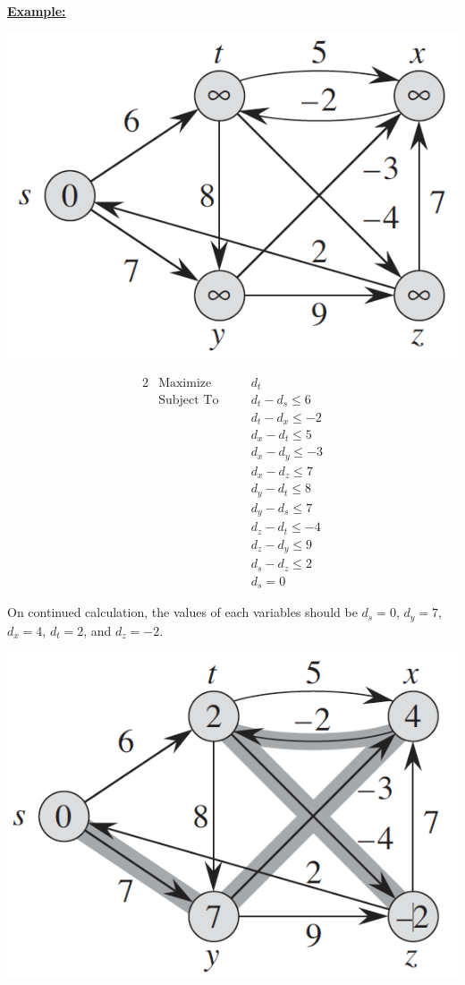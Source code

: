 \documentclass[12pt]{article}
\begin{document}
\begin{enumerate}[1.]
\begin{itemize}
        \bigskip

        \underline{\textbf{Example:}}

        \bigskip

        \begin{center}
        \includegraphics[width=0.4\linewidth]{images/worksheet_6_solution_17.png}
        \end{center}

        \bigskip

        \begin{alignat*}{2}
            & \text{Maximize}   & \quad & d_t           \\
            & \text{Subject To} &       & d_t - d_s \leq 6 \\
            &                   &       & d_t - d_x \leq -2 \\
            &                   &       & d_x - d_t \leq 5 \\
            &                   &       & d_x - d_y \leq -3 \\
            &                   &       & d_x - d_z \leq 7 \\
            &                   &       & d_y - d_t \leq 8 \\
            &                   &       & d_y - d_s \leq 7 \\
            &                   &       & d_z - d_t \leq -4 \\
            &                   &       & d_z - d_y \leq 9 \\
            &                   &       & d_s - d_z \leq 2 \\
            &                   &       & d_s = 0
        \end{alignat*}

        On continued calculation, the values of each variables should be $d_s = 0$, $d_y = 7$, $d_x = 4$,
        $d_t = 2$, and $d_z = -2$.

        \begin{center}
        \includegraphics[width=0.4\linewidth]{images/worksheet_6_solution_18.png}
        \end{center}


\end{itemize}
\end{enumerate}
\end{document}
